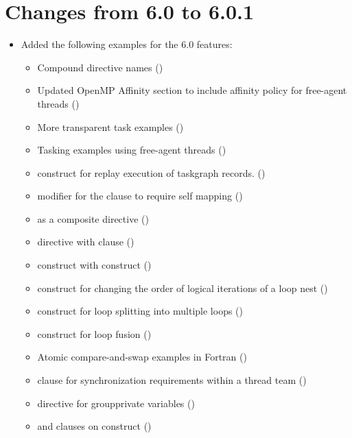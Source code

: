 \label{chap:history}

\section{Changes from 6.0 to 6.0.1}
\label{sec:history_60_to_601}

\begin{itemize}
\item Added the following examples for the 6.0 features:
\begin{itemize}
  \item Compound directive names ()
  \item Updated OpenMP Affinity section to include affinity policy for free-agent threads
    ()
  \item More transparent task examples
    ()
  \item Tasking examples using free-agent threads ()
  \item {} construct for replay execution of taskgraph records.
    ()
  \item {} modifier for the  clause to require self mapping
    ()
  \item {} as a composite directive 
    ()
  \item {} directive with  clause 
    ()
   \item {} construct with  construct 
    ()
  \item {} construct for changing the order of logical
    iterations of a loop nest ()
  \item {} construct for loop splitting into multiple loops
    ()
  \item {} construct for loop fusion ()
  \item Atomic compare-and-swap examples in Fortran
    ()
  \item {} clause for synchronization requirements within
    a thread team ()
  \item {} directive for groupprivate variables
    ()
  \item {} and  clauses on
     construct ()
\end{itemize}


\end{itemize}
